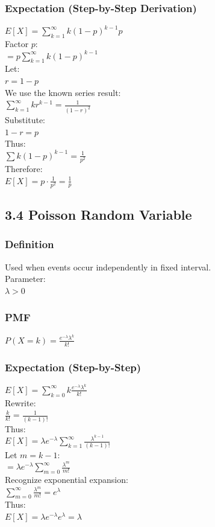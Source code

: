 \documentclass{article}
\begin{document}
\subsubsection{Expectation (Step-by-Step Derivation)}
$E[X] = \sum_{k=1}^{\infty} k(1-p)^{k-1}p$ \\
Factor $p$: \\
$= p \sum_{k=1}^{\infty} k(1-p)^{k-1}$ \\
Let: \\
$r = 1-p$ \\
We use the known series result: \\
$\sum_{k=1}^{\infty} kr^{k-1} = \frac{1}{(1-r)^2}$ \\
Substitute: \\
$1-r = p$ \\
Thus: \\
$\sum k(1-p)^{k-1} = \frac{1}{p^2}$ \\
Therefore: \\
$E[X] = p \cdot \frac{1}{p^2} = \frac{1}{p}$

\subsection{3.4 Poisson Random Variable}

\subsubsection{Definition}
Used when events occur independently in fixed interval. \\
Parameter: \\
$\lambda > 0$

\subsubsection{PMF}
$P(X=k) = \frac{e^{-\lambda}\lambda^k}{k!}$

\subsubsection{Expectation (Step-by-Step)}
$E[X] = \sum_{k=0}^{\infty} k\frac{e^{-\lambda}\lambda^k}{k!}$ \\
Rewrite: \\
$\frac{k}{k!} = \frac{1}{(k-1)!}$ \\
Thus: \\
$E[X] = \lambda e^{-\lambda} \sum_{k=1}^{\infty} \frac{\lambda^{k-1}}{(k-1)!}$ \\
Let $m = k-1$: \\
$= \lambda e^{-\lambda} \sum_{m=0}^{\infty} \frac{\lambda^m}{m!}$ \\
Recognize exponential expansion: \\
$\sum_{m=0}^{\infty} \frac{\lambda^m}{m!} = e^\lambda$ \\
Thus: \\
$E[X] = \lambda e^{-\lambda} e^\lambda = \lambda$
\end{document}
